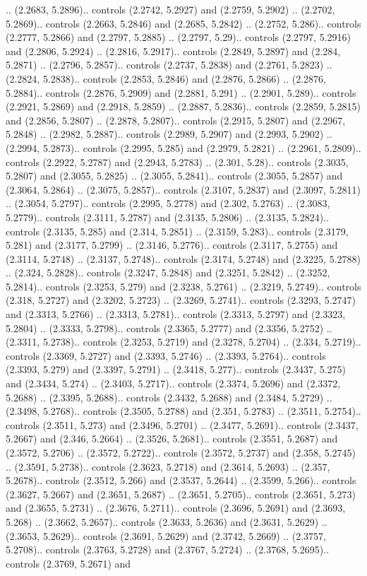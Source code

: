.. (2.2683, 5.2896).. controls (2.2742, 5.2927) and (2.2759, 5.2902) .. (2.2702, 5.2869).. controls (2.2663, 5.2846) and (2.2685, 5.2842) .. (2.2752, 5.286).. controls (2.2777, 5.2866) and (2.2797, 5.2885) .. (2.2797, 5.29).. controls (2.2797, 5.2916) and (2.2806, 5.2924) .. (2.2816, 5.2917).. controls (2.2849, 5.2897) and (2.284, 5.2871) .. (2.2796, 5.2857).. controls (2.2737, 5.2838) and (2.2761, 5.2823) .. (2.2824, 5.2838).. controls (2.2853, 5.2846) and (2.2876, 5.2866) .. (2.2876, 5.2884).. controls (2.2876, 5.2909) and (2.2881, 5.291) .. (2.2901, 5.289).. controls (2.2921, 5.2869) and (2.2918, 5.2859) .. (2.2887, 5.2836).. controls (2.2859, 5.2815) and (2.2856, 5.2807) .. (2.2878, 5.2807).. controls (2.2915, 5.2807) and (2.2967, 5.2848) .. (2.2982, 5.2887).. controls (2.2989, 5.2907) and (2.2993, 5.2902) .. (2.2994, 5.2873).. controls (2.2995, 5.285) and (2.2979, 5.2821) .. (2.2961, 5.2809).. controls (2.2922, 5.2787) and (2.2943, 5.2783) .. (2.301, 5.28).. controls (2.3035, 5.2807) and (2.3055, 5.2825) .. (2.3055, 5.2841).. controls (2.3055, 5.2857) and (2.3064, 5.2864) .. (2.3075, 5.2857).. controls (2.3107, 5.2837) and (2.3097, 5.2811) .. (2.3054, 5.2797).. controls (2.2995, 5.2778) and (2.302, 5.2763) .. (2.3083, 5.2779).. controls (2.3111, 5.2787) and (2.3135, 5.2806) .. (2.3135, 5.2824).. controls (2.3135, 5.285) and (2.314, 5.2851) .. (2.3159, 5.283).. controls (2.3179, 5.281) and (2.3177, 5.2799) .. (2.3146, 5.2776).. controls (2.3117, 5.2755) and (2.3114, 5.2748) .. (2.3137, 5.2748).. controls (2.3174, 5.2748) and (2.3225, 5.2788) .. (2.324, 5.2828).. controls (2.3247, 5.2848) and (2.3251, 5.2842) .. (2.3252, 5.2814).. controls (2.3253, 5.279) and (2.3238, 5.2761) .. (2.3219, 5.2749).. controls (2.318, 5.2727) and (2.3202, 5.2723) .. (2.3269, 5.2741).. controls (2.3293, 5.2747) and (2.3313, 5.2766) .. (2.3313, 5.2781).. controls (2.3313, 5.2797) and (2.3323, 5.2804) .. (2.3333, 5.2798).. controls (2.3365, 5.2777) and (2.3356, 5.2752) .. (2.3311, 5.2738).. controls (2.3253, 5.2719) and (2.3278, 5.2704) .. (2.334, 5.2719).. controls (2.3369, 5.2727) and (2.3393, 5.2746) .. (2.3393, 5.2764).. controls (2.3393, 5.279) and (2.3397, 5.2791) .. (2.3418, 5.277).. controls (2.3437, 5.275) and (2.3434, 5.274) .. (2.3403, 5.2717).. controls (2.3374, 5.2696) and (2.3372, 5.2688) .. (2.3395, 5.2688).. controls (2.3432, 5.2688) and (2.3484, 5.2729) .. (2.3498, 5.2768).. controls (2.3505, 5.2788) and (2.351, 5.2783) .. (2.3511, 5.2754).. controls (2.3511, 5.273) and (2.3496, 5.2701) .. (2.3477, 5.2691).. controls (2.3437, 5.2667) and (2.346, 5.2664) .. (2.3526, 5.2681).. controls (2.3551, 5.2687) and (2.3572, 5.2706) .. (2.3572, 5.2722).. controls (2.3572, 5.2737) and (2.358, 5.2745) .. (2.3591, 5.2738).. controls (2.3623, 5.2718) and (2.3614, 5.2693) .. (2.357, 5.2678).. controls (2.3512, 5.266) and (2.3537, 5.2644) .. (2.3599, 5.266).. controls (2.3627, 5.2667) and (2.3651, 5.2687) .. (2.3651, 5.2705).. controls (2.3651, 5.273) and (2.3655, 5.2731) .. (2.3676, 5.2711).. controls (2.3696, 5.2691) and (2.3693, 5.268) .. (2.3662, 5.2657).. controls (2.3633, 5.2636) and (2.3631, 5.2629) .. (2.3653, 5.2629).. controls (2.3691, 5.2629) and (2.3742, 5.2669) .. (2.3757, 5.2708).. controls (2.3763, 5.2728) and (2.3767, 5.2724) .. (2.3768, 5.2695).. controls (2.3769, 5.2671) and 